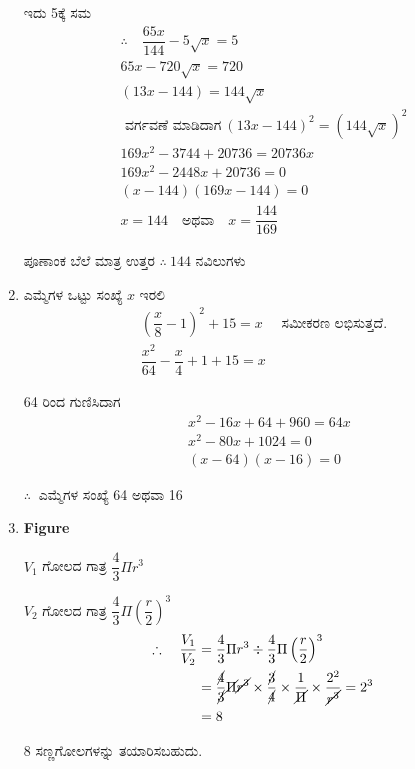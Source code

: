 \begin{enumerate}
ಇದು 5ಕ್ಕೆ ಸಮ 
\begin{gather*}
\therefore\quad \dfrac{65x}{144} - 5\sqrt{x} = 5\\
65x - 720\sqrt{x} = 720\\
(13x - 144) = 144\sqrt{x}\\
\text{ ವರ್ಗವಣೆ ಮಾಡಿದಾಗ}~ (13x - 144)^{2} = (144\sqrt{x})^{2}\\
169x^{2} - 3744 + 20736 = 20736x\\
169x^{2} - 2448x + 20736 = 0\\
(x - 144)(169x - 144) = 0\\
x = 144 \quad\text{ಅಥವಾ}\quad x = \dfrac{144}{169}
\end{gather*}

ಪೂಣಾಂಕ ಬೆಲೆ ಮಾತ್ರ ಉತ್ತರ $\therefore~ 144$ ನವಿಲುಗಳು 

\item ಎಮ್ಮೆಗಳ ಒಟ್ಟು ಸಂಖ್ಯೆ $x$ ಇರಲಿ 
\begin{gather*}
\left(\dfrac{x}{8} - 1\right)^{2} + 15 = x \quad\text{ ಸಮೀಕರಣ ಲಭಿಸುತ್ತದೆ.}\\
\dfrac{x^{2}}{64} - \dfrac{x}{4} + 1 + 15 = x
\end{gather*}

64 ರಿಂದ ಗುಣಿಸಿದಾಗ 
\begin{align*}
& x^{2} - 16x + 64 + 960 = 64x\\
& x^{2} - 80x + 1024 = 0\\
& (x - 64) (x - 16) = 0
\end{align*}

$\therefore~$ ಎಮ್ಮೆಗಳ ಸಂಖ್ಯೆ 64 ಅಥವಾ  16

\item 
\begin{center}
{\bf Figure}
\end{center}

$V_{1}$ ಗೋಲದ ಗಾತ್ರ $\dfrac{4}{3} \Pi r^{3}$

$V_{2}$ ಗೋಲದ ಗಾತ್ರ $\dfrac{4}{3} \Pi \left(\dfrac{r}{2}\right)^{3}$
\begin{align*}
\therefore\quad\dfrac{V_{1}}{V_{2}} & = \dfrac{4}{3}\Pi r^{3} \div {\dfrac{4}{3}\Pi \left(\dfrac{r}{2}\right)^{3}}\\
& = \dfrac{\cancel{4}}{\cancel{3}} \cancel{\Pi} \cancel{r^{3}} \times \dfrac{\cancel{3}}{\cancel{4}} \times \dfrac{1}{\cancel{\Pi}} \times \dfrac{2^{2}}{\cancel{r^{3}}} = 2^{3}\\
& = 8
\end{align*}

8 ಸಣ್ಣಗೋಲಗಳನ್ನು ತಯಾರಿಸಬಹುದು. 


\end{enumerate}
